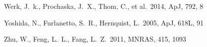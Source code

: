 \documentclass[useAMS,usenatbib]{mn2e}
\def \apj {ApJ}
\def \mnras {MNRAS}
\begin{document}
\begin{thebibliography}{}
 Werk, J.~k., Prochaska, J.~X., Thom, C., et al.\ 2014, \apj, 792, 8



Yoshida, N., Furlanetto, S.~R., Hernquist, L.\ 2005, \apj, 618L, 91


 Zhu, W., Feng, L.~L., Fang, L.~Z.\ 2011, \mnras, 415, 1093

\end{thebibliography}

\label{lastpage}
\end{document}
